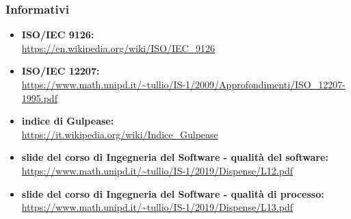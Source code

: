 		\subsubsection{Informativi}
		\begin{itemize}
			\item \textbf{ISO/IEC 9126:}\\
			\url{https://en.wikipedia.org/wiki/ISO/IEC_9126}
			\item \textbf{ISO/IEC 12207:}\\
			\url{https://www.math.unipd.it/~tullio/IS-1/2009/Approfondimenti/ISO_12207-1995.pdf}
			\item \textbf{indice di Gulpease:}\\
			\url{https://it.wikipedia.org/wiki/Indice_Gulpease}
			\item \textbf{slide del corso di Ingegneria del Software - qualità del software:}\\
			\url{https://www.math.unipd.it/~tullio/IS-1/2019/Dispense/L12.pdf}
			\item \textbf{slide del corso di Ingegneria del Software - qualità di processo:}\\
			\url{https://www.math.unipd.it/~tullio/IS-1/2019/Dispense/L13.pdf}
		
		\end{itemize}
	